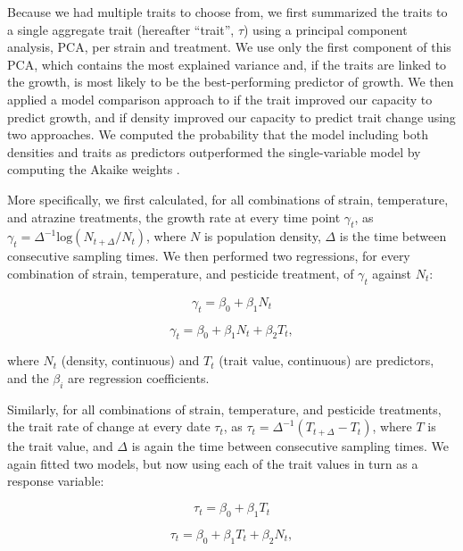 \documentclass{getwriting}
\begin{document}
Because we had multiple traits to choose from, we first summarized the traits to a single aggregate trait (hereafter ``trait'', $\tau$) using a principal component analysis, PCA, per strain and treatment. We use only the first component of this PCA, which contains the most explained variance and, if the traits are linked to the growth, is most likely to be the best-performing predictor of growth. We then applied a model comparison approach to if the trait improved our capacity to predict growth, and if density improved our capacity to predict trait change using two approaches. We computed the probability that the model including both densities and traits as predictors outperformed the single-variable model by  computing the Akaike weights \cite{Burnham2004}. 

More specifically, we first calculated, for all combinations of strain, temperature, and atrazine treatments, the growth rate at every time point $\gamma_t$, as $\gamma_t=\Delta^{-1}\textrm{log}(N_{t+\Delta}/N_t)$, where $N$ is population density, $\Delta$ is the time between consecutive sampling times. We then performed two regressions, for every combination of strain, temperature, and pesticide treatment, of $\gamma_t$ against $N_t$: 

\begin{equation}
\label{eq:pcgr}
\gamma_t = \beta_0 + \beta_1 N_t  
\end{equation}

\begin{equation}
\label{eq:pcgrExtd}
\gamma_t = \beta_0 + \beta_1 N_t + \beta_2 T_t,
\end{equation}

where $N_t$ (density, continuous) and $T_t$ (trait value, continuous) are predictors, and the $\beta_i$ are regression coefficients. 

Similarly, for all combinations of strain, temperature, and pesticide treatments, the trait rate of change at every date $\tau_t$, as $\tau_t=\Delta^{-1}(T_{t+\Delta}-T_{t})$, where $T$ is the trait value, and $\Delta$ is again the time between consecutive sampling times. We again fitted two models, but now using each of the trait values in turn as a response variable: 

\begin{equation}
\label{eq:dT}
\tau_t = \beta_0 + \beta_1 T_t  
\end{equation}

\begin{equation}
\label{eq:dTExtd}
\tau_t = \beta_0 + \beta_1 T_t + \beta_2 N_t,
\end{equation}
\end{document}
